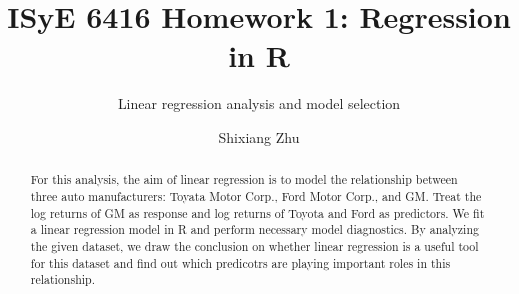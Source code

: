 \documentclass[sigconf]{acmart}
\begin{document}
\title{ISyE 6416 Homework 1: Regression in R}
\subtitle{Linear regression analysis and model selection}

\author{Shixiang Zhu}

\begin{abstract}
For this analysis, the aim of linear regression is to model the relationship between three auto manufacturers: Toyata Motor Corp., Ford Motor Corp., and GM. Treat the log returns of GM as response and log returns of Toyota and Ford as predictors. We fit a linear regression model in R and perform necessary model diagnostics. By analyzing the given dataset, we draw the conclusion on whether linear regression is a useful tool for this dataset and find out which predicotrs are playing important roles in this relationship.
\end{abstract}


\maketitle
\newcommand{\norm}[1]{\left\lVert#1\right\rVert}


% 
% 
\end{document}
